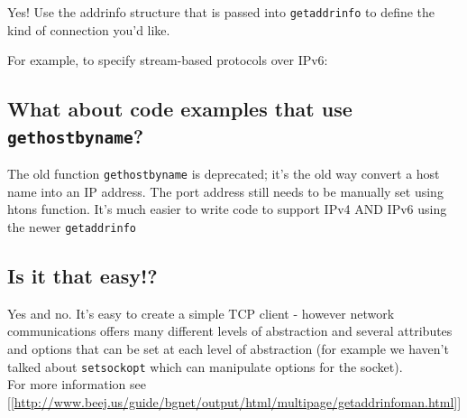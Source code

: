 Yes! Use the addrinfo structure that is passed into \texttt{getaddrinfo}
to define the kind of connection you'd like.

For example, to specify stream-based protocols over IPv6:

\begin{Shaded}
\begin{Highlighting}[]
 
\NormalTok{, }

\end{Highlighting}
\end{Shaded}

\subsection{\texorpdfstring{What about code examples that use
\texttt{gethostbyname}?}{What about code examples that use gethostbyname?}}\label{what-about-code-examples-that-use-gethostbyname}

The old function \texttt{gethostbyname} is deprecated; it's the old way
convert a host name into an IP address. The port address still needs to
be manually set using htons function. It's much easier to write code to
support IPv4 AND IPv6 using the newer \texttt{getaddrinfo}

\subsection{Is it that easy!?}\label{is-it-that-easy}

Yes and no. It's easy to create a simple TCP client - however network
communications offers many different levels of abstraction and several
attributes and options that can be set at each level of abstraction (for
example we haven't talked about \texttt{setsockopt} which can manipulate
options for the socket).\\For more information
see\\{[}{[}\url{http://www.beej.us/guide/bgnet/output/html/multipage/getaddrinfoman.html}{]}{]}

